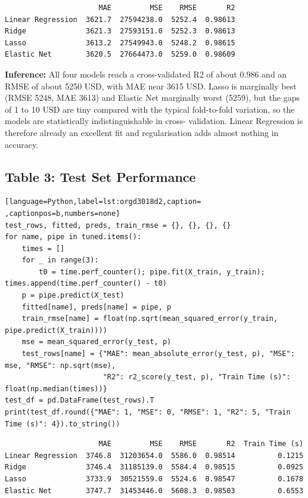 \documentclass[11pt]{article}
\begin{document}
\begin{verbatim}
                      MAE         MSE    RMSE       R2
Linear Regression  3621.7  27594238.0  5252.4  0.98613
Ridge              3621.3  27593151.0  5252.3  0.98613
Lasso              3613.2  27549943.0  5248.2  0.98615
Elastic Net        3620.5  27664473.0  5259.0  0.98609
\end{verbatim}


\textbf{Inference:} All four models reach a cross-validated R2 of about 0.986 and an RMSE of about 5250 USD,
with MAE near 3615 USD. Lasso is marginally best (RMSE 5248, MAE 3613) and Elastic Net
marginally worst (5259), but the gaps of 1 to 10 USD are tiny compared with the typical
fold-to-fold variation, so the models are statistically indistinguishable in cross-
validation. Linear Regression is therefore already an excellent fit and regularisation adds
almost nothing in accuracy.

\subsection*{Table 3: Test Set Performance}
\label{sec:org042d8e9}

\begin{lstlisting}[language=Python,label=lst:orgd3018d2,caption= ,captionpos=b,numbers=none]
test_rows, fitted, preds, train_rmse = {}, {}, {}, {}
for name, pipe in tuned.items():
    times = []
    for _ in range(3):
        t0 = time.perf_counter(); pipe.fit(X_train, y_train); times.append(time.perf_counter() - t0)
    p = pipe.predict(X_test)
    fitted[name], preds[name] = pipe, p
    train_rmse[name] = float(np.sqrt(mean_squared_error(y_train, pipe.predict(X_train))))
    mse = mean_squared_error(y_test, p)
    test_rows[name] = {"MAE": mean_absolute_error(y_test, p), "MSE": mse, "RMSE": np.sqrt(mse),
                       "R2": r2_score(y_test, p), "Train Time (s)": float(np.median(times))}
test_df = pd.DataFrame(test_rows).T
print(test_df.round({"MAE": 1, "MSE": 0, "RMSE": 1, "R2": 5, "Train Time (s)": 4}).to_string())
\end{lstlisting}

\begin{verbatim}
                      MAE         MSE    RMSE       R2  Train Time (s)
Linear Regression  3746.8  31203654.0  5586.0  0.98514          0.1215
Ridge              3746.4  31185139.0  5584.4  0.98515          0.0925
Lasso              3733.9  30521559.0  5524.6  0.98547          0.1678
Elastic Net        3747.7  31453446.0  5608.3  0.98503          0.6553
\end{verbatim}
\end{document}
